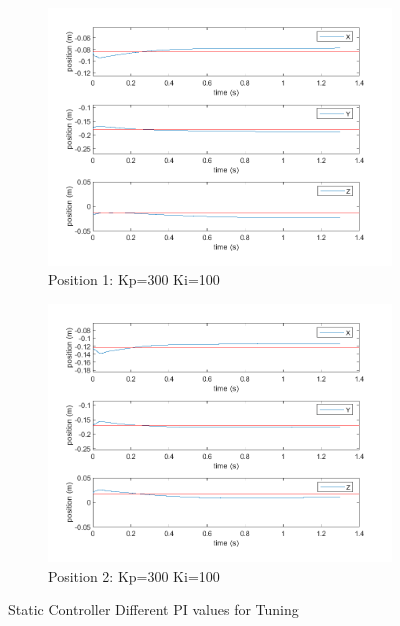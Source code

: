 \begin{figure}[ht]
    \begin{subfigure}[b]{0.45\textwidth}
        \includegraphics[width=\linewidth]{Pictures/Controller/Kp300Ki100/1.png}
        \caption{Position 1: Kp=300 Ki=100}
    \end{subfigure}%
    \hfill
    \begin{subfigure}[b]{0.45\textwidth}
        \includegraphics[width=\linewidth]{Pictures/Controller/Kp300Ki100/17.png}
        \caption{Position 2: Kp=300 Ki=100}
    \end{subfigure}

    \caption{Static Controller Different PI values for Tuning}
    \label{fig:staticPItuning}
\end{figure}


